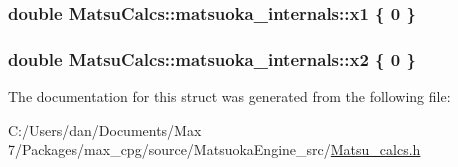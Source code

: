 \subsubsection[{\texorpdfstring{x1}{x1}}]{\setlength{\rightskip}{0pt plus 5cm}double Matsu\+Calcs\+::matsuoka\+\_\+internals\+::x1 \{ 0 \}}\hypertarget{structMatsuCalcs_1_1matsuoka__internals_a94e9d15c2de229653c4bf4542cf7df34}{}\label{structMatsuCalcs_1_1matsuoka__internals_a94e9d15c2de229653c4bf4542cf7df34}
\subsubsection[{\texorpdfstring{x2}{x2}}]{\setlength{\rightskip}{0pt plus 5cm}double Matsu\+Calcs\+::matsuoka\+\_\+internals\+::x2 \{ 0 \}}\hypertarget{structMatsuCalcs_1_1matsuoka__internals_a5e8455597562089dae55b3b6598433ad}{}\label{structMatsuCalcs_1_1matsuoka__internals_a5e8455597562089dae55b3b6598433ad}


The documentation for this struct was generated from the following file\+:\begin{DoxyCompactItemize}
\item 
C\+:/\+Users/dan/\+Documents/\+Max 7/\+Packages/max\+\_\+cpg/source/\+Matsuoka\+Engine\+\_\+src/\hyperlink{Matsu__calcs_8h}{Matsu\+\_\+calcs.\+h}\end{DoxyCompactItemize}
